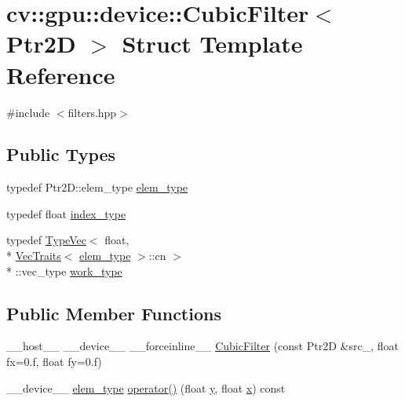 \hypertarget{structcv_1_1gpu_1_1device_1_1CubicFilter}{\section{cv\-:\-:gpu\-:\-:device\-:\-:Cubic\-Filter$<$ Ptr2\-D $>$ Struct Template Reference}
\label{structcv_1_1gpu_1_1device_1_1CubicFilter}
}


{\ttfamily \#include $<$filters.\-hpp$>$}

\subsection*{Public Types}
\begin{DoxyCompactItemize}
\item 
typedef Ptr2\-D\-::elem\-\_\-type \hyperlink{structcv_1_1gpu_1_1device_1_1CubicFilter_aa110373ae66f3624d67541afc41264ef}{elem\-\_\-type}
\item 
typedef float \hyperlink{structcv_1_1gpu_1_1device_1_1CubicFilter_ad5a5d76f07537ca8cc64ec366ac691c4}{index\-\_\-type}
\item 
typedef \hyperlink{structcv_1_1gpu_1_1device_1_1TypeVec}{Type\-Vec}$<$ float, \\*
\hyperlink{structcv_1_1gpu_1_1device_1_1VecTraits}{Vec\-Traits}$<$ \hyperlink{structcv_1_1gpu_1_1device_1_1CubicFilter_aa110373ae66f3624d67541afc41264ef}{elem\-\_\-type} $>$\-::cn $>$\\*
\-::vec\-\_\-type \hyperlink{structcv_1_1gpu_1_1device_1_1CubicFilter_a2e4c3b9d18f4f3f2e002d8f66144e655}{work\-\_\-type}
\end{DoxyCompactItemize}
\subsection*{Public Member Functions}
\begin{DoxyCompactItemize}
\item 
\-\_\-\-\_\-host\-\_\-\-\_\- \-\_\-\-\_\-device\-\_\-\-\_\- \-\_\-\-\_\-forceinline\-\_\-\-\_\- \hyperlink{structcv_1_1gpu_1_1device_1_1CubicFilter_a70c9dd79d6251ef2a0dd14a58e601279}{Cubic\-Filter} (const Ptr2\-D \&src\-\_\-, float fx=0.f, float fy=0.f)
\item 
\-\_\-\-\_\-device\-\_\-\-\_\- \hyperlink{structcv_1_1gpu_1_1device_1_1CubicFilter_aa110373ae66f3624d67541afc41264ef}{elem\-\_\-type} \hyperlink{structcv_1_1gpu_1_1device_1_1CubicFilter_a5294b55c0f0108f36ff83ebe73aad1a3}{operator()} (float \hyperlink{highgui__c_8h_af1202c02b14870c18fb3a1da73e9e7c7}{y}, float \hyperlink{highgui__c_8h_a6150e0515f7202e2fb518f7206ed97dc}{x}) const 
\end{DoxyCompactItemize}

